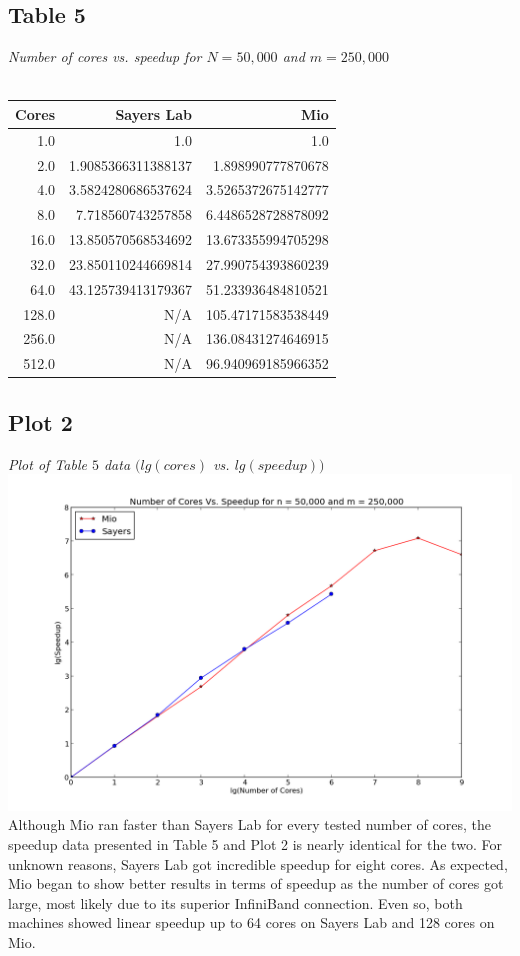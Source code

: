 \documentclass[letterpaper, 12pt]{article}
\begin{document}
	\subsection*{Table 5} \small\textit{Number of cores vs. speedup for $N=50,000$ and $m=250,000$} \\\\
	\normalsize
	\begin{tabular}{r||r|r}
	\hline
  Cores              &Sayers Lab                     &Mio \\ 
	\hline
		  1.0                     &1.0                     &1.0 \\ 
		  2.0      &1.9085366311388137       &1.898990777870678 \\ 
		  4.0      &3.5824280686537624      &3.5265372675142777 \\ 
		  8.0       &7.718560743257858      &6.4486528728878092 \\ 
		 16.0      &13.850570568534692      &13.673355994705298 \\ 
		 32.0      &23.850110244669814      &27.990754393860239 \\ 
		 64.0      &43.125739413179367      &51.233936484810521 \\ 
		128.0                     &N/A      &105.47171583538449 \\ 
		256.0                     &N/A      &136.08431274646915 \\ 
		512.0                     &N/A      &96.940969185966352 \\ 
		\hline
	\end{tabular}
	
	\subsection*{Plot 2} \small\textit{Plot of Table $5$ data $(lg(cores)$ vs. $lg(speedup))$} \\
	\normalsize
	\includegraphics[width=.75\linewidth]{ProjectFiles/results/plots/coresVspeedup.png} \\
	Although Mio ran faster than Sayers Lab for every tested number of cores, the speedup data presented in Table 5 and Plot 2 is nearly identical for the two. For unknown reasons, Sayers Lab got incredible speedup for eight cores. As expected, Mio began to show better results in terms of speedup as the number of cores got large, most likely due to its superior InfiniBand connection. Even so, both machines showed linear speedup up to 64 cores on Sayers Lab and 128 cores on Mio.
	
\end{document}
